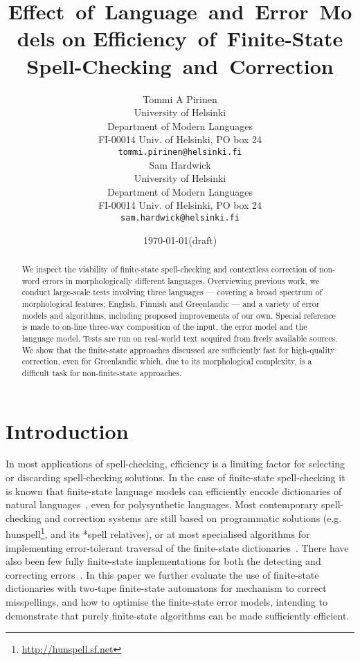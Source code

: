 \documentclass[11pt]{article}
\title{Effect~of~Language~and~Error~Models on Efficiency~of~Finite-State
Spell-Checking~and~Correction}
\author{
Tommi A Pirinen\\
University of Helsinki\\
Department of Modern Languages\\
FI-00014 Univ. of Helsinki, PO box 24\\
{\tt tommi.pirinen@helsinki.fi} \\\And
Sam Hardwick\\
University of Helsinki\\
Department of Modern Languages\\
FI-00014 Univ. of Helsinki, PO box 24\\
{\tt sam.hardwick@helsinki.fi} \\
}
\date{\today (draft)}
\begin{document}
\maketitle 

\begin{abstract} We inspect the viability of finite-state
spell-checking and contextless correction of non-word errors in morphologically
different languages. Overviewing previous
work, we conduct large-scale tests involving three languages
--- covering a broad spectrum of morphological features;
English, Finnish and Greenlandic --- and a variety of
error models and algorithms, including proposed
improvements of our own. Special reference is made to on-line
three-way composition of the input, the error model and the language model.
Tests are run on real-world text acquired from
freely available sources.
We show that the finite-state approaches discussed are sufficiently fast
for high-quality correction, even for Greenlandic which, due to its morphological
complexity, is a difficult task for non-finite-state approaches.
\end{abstract}

\section{Introduction}
\label{sec:introduction}

In most applications of spell-checking, efficiency is a limiting factor for
selecting or discarding spell-checking solutions. In the case of finite-state
spell-checking it is known that finite-state language models can efficiently
encode dictionaries of natural languages~\cite{beesley/2003}, even for
polysynthetic languages. Most
contemporary spell-checking and correction systems are still based on
programmatic solutions (e.g.  hunspell\footnote{\url{http://hunspell.sf.net}},
and its *spell relatives), or at most specialised algorithms for implementing
error-tolerant traversal of the finite-state
dictionaries~\cite{oflazer/1996,hulden/2009}. There have also been few fully
finite-state implementations for both the detecting and correcting
errors~\cite{schulz/2002,pirinen/2010/lrec}. In this paper we further evaluate
the use of finite-state dictionaries with two-tape finite-state automatons for
mechanism to correct misspellings, and how to optimise the finite-state error
models, intending to demonstrate that purely finite-state algorithms can
be made sufficiently efficient.
\end{document}
